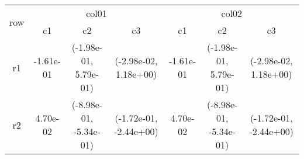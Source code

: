 \begin{tabular}{ccccccc}
\toprule
\multirow{2}{*}{row}&\multicolumn{3}{c}{col01}&\multicolumn{3}{c}{col02}\tabularnewline
\cmidrule(lr){2-4}
\cmidrule(lr){5-7}
&c1&c2&c3&c1&c2&c3\tabularnewline
\midrule
r1&-1.61e-01& (-1.98e-01, 5.79e-01)& (-2.98e-02, 1.18e+00)&-1.61e-01& (-1.98e-01, 5.79e-01)& (-2.98e-02, 1.18e+00)\tabularnewline
r2&4.70e-02& (-8.98e-01, -5.34e-01)& (-1.72e-01, -2.44e+00)&4.70e-02& (-8.98e-01, -5.34e-01)& (-1.72e-01, -2.44e+00)\tabularnewline
\bottomrule
\end{tabular}
